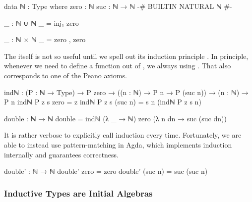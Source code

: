\begin{code}
data ℕ : Type where
  zero : ℕ
  suc : ℕ → ℕ
{-# BUILTIN NATURAL ℕ #-}

_ : ℕ ⊎ ℕ
_ = inj₁ zero

_ : ℕ × ℕ
_ = zero , zero
\end{code}

 The  itself is not so useful until we spell out its induction principle . In principle, whenever we need to define a function out of , we always using . That also corresponds to one of the Peano axioms.

\begin{code}
indℕ : (P : ℕ → Type)
  → P zero
  → ((n : ℕ) → P n → P (suc n))
  → (n : ℕ) → P n
indℕ P z s zero = z
indℕ P z s (suc n) = s n (indℕ P z s n)

double : ℕ → ℕ
double = indℕ (λ _ → ℕ) zero (λ n dn → suc (suc dn))
\end{code}

It is rather verbose to explicitly call induction every time. Fortunately, we are able to instead use pattern-matching in Agda, which implements induction internally and guarantees correctness.

\begin{code}
double' : ℕ → ℕ
double' zero = zero
double' (suc n) = suc (suc n)
\end{code}

\subsubsection*{Inductive Types are Initial Algebras}

